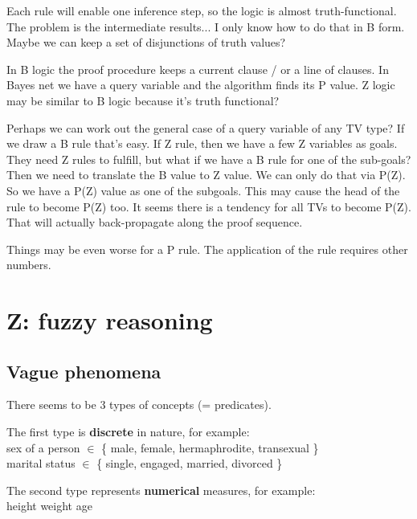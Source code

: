 
Each rule will enable one inference step, so the logic is almost truth-functional.  The problem is the intermediate results... I only know how to do that in B form.  Maybe we can keep a set of disjunctions of truth values?

In B logic the proof procedure keeps a current clause / or a line of clauses.  In Bayes net we have a query variable and the algorithm finds its P value.  Z logic may be similar to B logic because it's truth functional?

Perhaps we can work out the general case of a query variable of any TV type?  If we draw a B rule that's easy.  If Z rule, then we have a few Z variables as goals.  They need Z rules to fulfill, but what if we have a B rule for one of the sub-goals?  Then we need to translate the B value to Z value.  We can only do that via P(Z).  So we have a P(Z) value as one of the subgoals.  This may cause the head of the rule to become P(Z) too.  It seems there is a tendency for all TVs to become P(Z).
That will actually back-propagate along the proof sequence.

Things may be even worse for a P rule.  The application of the rule requires other numbers.  

\section{Z: fuzzy reasoning}

\subsection{Vague phenomena}

There seems to be 3 types of concepts (= predicates).

The first type is \textbf{discrete} in nature, for example:\\
\hspace*{1cm} sex of a person $\in$ \{ male, female, hermaphrodite, transexual \}\\
\hspace*{1cm} marital status $\in$ \{ single, engaged, married, divorced \}

The second type represents \textbf{numerical} measures, for example:\\
\hspace*{1cm} height \hspace*{1cm} weight \hspace*{1cm} age

